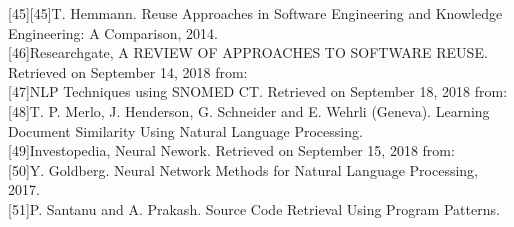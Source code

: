 \documentclass[a4paper]{article}
\begin{document}
[45][45]T. Hemmann. Reuse Approaches in Software Engineering and
Knowledge Engineering: A Comparison, 2014. \\
[46][46]Researchgate, A REVIEW OF APPROACHES TO SOFTWARE REUSE. Retrieved on September 14, 2018 from: \href{https://www.researchgate.net/publication/263926582/download/}\\
[47][47]NLP Techniques using SNOMED CT. Retrieved on September 18, 2018 from: \href{https://confluence.ihtsdotools.org/display/DOCANLYT/5.1+Natural+Language+Processing/}\\
[48][48]T. P. Merlo, J. Henderson, G. Schneider and E. Wehrli (Geneva). Learning Document Similarity
Using Natural Language Processing. \\
[49][49]Investopedia, Neural Nework. Retrieved on September 15, 2018 from: \href{https://www.investopedia.com/terms/n/neuralnetwork.asp}\\
[50][50]Y. Goldberg. Neural Network Methods for Natural Language Processing, 2017. \\
[51][51]P. Santanu and A. Prakash.  Source Code Retrieval Using Program Patterns. \\
\end{document}
